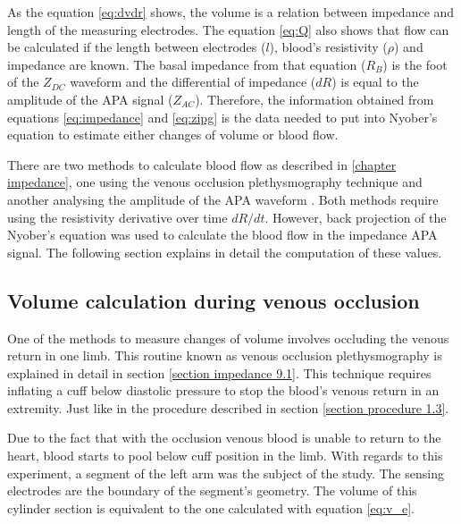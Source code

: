 As the equation \ref{eq:dvdr} shows, the volume is a relation between impedance and length of the measuring electrodes. The equation \ref{eq:Q} also shows that flow can be calculated if the length between electrodes ($l$), blood's resistivity ($\rho$) and impedance are known.  The basal impedance from that equation ($R_B$) is the foot of the $Z_{DC}$ waveform and the differential of impedance ($dR$) is equal to the amplitude of the APA signal ($Z_{AC}$). Therefore, the information obtained from equations \ref{eq:impedance} and \ref{eq:zipg} is the data needed to put into Nyober's equation to estimate either changes of volume or blood flow.

There are two methods to calculate blood flow as described in \ref{chapter impedance}, one using the venous occlusion plethysmography technique \cite{anderson1984impedance,costeloe1980continuous,mohapatra1981non,golden1986assessment} and another analysing the amplitude of the APA waveform \cite{nyboer1974blood,costeloe1980continuous}. Both methods require using the resistivity derivative over time $dR/dt$. However, back projection of the Nyober's equation was used to calculate the blood flow in the impedance APA signal. The following section explains in detail the computation of these values.  

\subsection{Volume calculation during venous occlusion}
\label{section procedure 4.1}
One of the methods to measure changes of volume involves occluding the venous return in one limb. This routine known as venous occlusion plethysmography is explained in detail in section \ref{section impedance 9.1}. This technique requires inflating a cuff below diastolic pressure to stop the blood's venous return in an extremity. Just like in the procedure described in section \ref{section procedure 1.3}. 

Due to the fact that with the occlusion venous blood is unable to return to the heart, blood starts to pool below cuff position in the limb. With regards to this experiment, a segment of the left arm was the subject of the study. The sensing electrodes are the boundary of the segment's geometry. The volume of this cylinder section is equivalent to the one calculated with equation \ref{eq:v_e}. 


